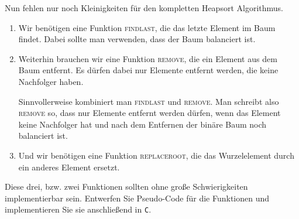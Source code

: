 \documentclass[tikz,12pt]{article}
\begin{document}
Nun fehlen nur noch Kleinigkeiten für den kompletten Heapsort Algorithmus.
\begin{enumerate}
\item Wir benötigen eine Funktion \textsc{findlast}, die das letzte Element im Baum findet. 
  Dabei sollte man verwenden, dass der Baum balanciert ist.
\item Weiterhin brauchen wir eine Funktion \textsc{remove}, die ein Element aus dem Baum entfernt.
  Es dürfen dabei nur Elemente entfernt werden, die keine Nachfolger haben.

  Sinnvollerweise kombiniert man \textsc{findlast} und \textsc{remove}. 
  Man schreibt also \textsc{remove} so, dass nur Elemente entfernt werden dürfen, wenn das Element keine Nachfolger hat und nach dem Entfernen der binäre Baum noch balanciert ist.
\item Und wir benötigen eine Funktion \textsc{replaceroot}, die das Wurzelelement durch ein anderes Element ersetzt.
\end{enumerate}
Diese drei, bzw. zwei Funktionen sollten ohne große Schwierigkeiten implementierbar sein.
Entwerfen Sie Pseudo-Code für die Funktionen und implementieren Sie sie anschließend in \texttt{C}.
\end{document}
